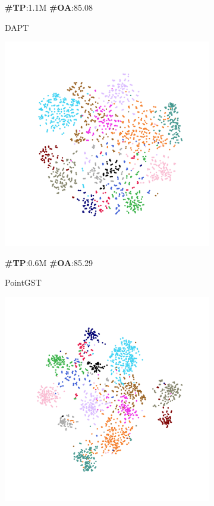 \begin{figure}
\begin{subfigure}{0.24\textwidth}
        \caption*{\textbf{\#TP}:1.1M \textbf{\#OA}:85.08}
        \caption{DAPT}
        \label{fig:sub4}
    \end{subfigure}
    \hfill
    \begin{subfigure}{0.24\textwidth}
        \centering
        \includegraphics[width=\linewidth]{fig/tsne/pointgst.pdf}
        \caption*{\textbf{\#TP}:0.6M \textbf{\#OA}:85.29}
        \caption{PointGST}
        \label{fig:sub5}
    \end{subfigure}
    \hfill
    \begin{subfigure}{0.24\textwidth}
        \centering
        \includegraphics[width=\linewidth]{fig/tsne/PPT.pdf}

\end{subfigure}
\end{figure}
